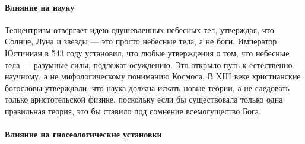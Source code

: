 \paragraph{Влияние на науку}

Теоцентризм отвергает идею одушевленных небесных тел, утверждая, что Солнце, Луна и звезды --- это просто небесные тела, а не боги. Император Юстиниан в 543 году установил, что любые утверждения о том, что небесные тела --- разумные силы, подлежат осуждению. Это открыло путь к естественно-научному, а не мифологическому пониманию Космоса. В XIII веке христианские богословы утверждали, что наука должна искать новые теории, а не следовать только аристотельской физике, поскольку если бы существовала только одна правильная теория, это бы ставило под сомнение всемогущество Бога.

\paragraph{Влияние на гносеологические установки} 


